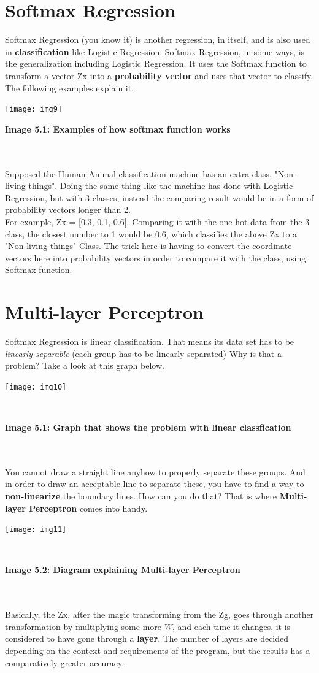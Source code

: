 \documentclass{article}
\begin{document}
\section{Softmax Regression}
Softmax Regression (you know it) is another regression, in itself, and is also used in \textbf{classification} like Logistic Regression. Softmax Regression, in some ways, is the generalization including Logistic Regression. It uses the Softmax function to transform a vector Zx into a \textbf{probability vector} and uses that vector to classify. The following examples explain it.\\
\centerline{\texttt{[image: img9]}}
\centerline{\small{\textbf{ Image 5.1: Examples of how softmax function works}}}\\\\
\tab\tab Supposed the Human-Animal classification machine has an extra class, "Non-living things". Doing the same thing like the machine has done with Logistic Regression, but with 3 classes, instead the comparing result would be in a form of probability vectors longer than 2. \\
\tab\tab For example, Zx = [0.3, 0.1, 0.6]. Comparing it with the one-hot data from the 3 class, the closest number to 1 would be 0.6, which classifies the above Zx to a "Non-living things" Class. The trick here is having to convert the coordinate vectors here into probability vectors in order to compare it with the class, using Softmax function.
\section{Multi-layer Perceptron}
Softmax Regression is linear classification. That means its data set has to be \textit{linearly separable} (each group has to be linearly separated) Why is that a problem? Take a look at this graph below.\\
\centerline{\texttt{[image: img10]}}\\
\centerline{\small{\textbf{ Image 5.1: Graph that shows the problem with linear classfication}}}\\\\
\tab\tab You cannot draw a straight line anyhow to properly separate these groups. And in order to draw an acceptable line to separate these, you have to find a way to \textbf{non-linearize} the boundary lines. How can you do that? That is where \textbf{Multi-layer Perceptron} comes into handy.\\
\centerline{\texttt{[image: img11]}}\\
\centerline{\small{\textbf{ Image 5.2: Diagram explaining Multi-layer Perceptron}}}\\\\
\tab \tab Basically, the Zx, after the magic transforming from the Zg, goes through another transformation by multiplying some more $W$, and each time it changes, it is considered to have gone through a \textbf{layer}. The number of layers are decided depending on the context and requirements of the program, but the results has a comparatively greater accuracy.  
\end{document}
